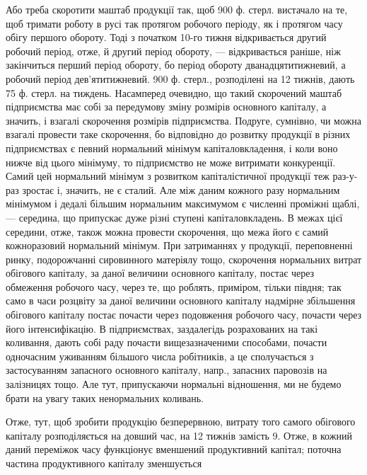 Або треба скоротити маштаб продукції так, щоб 900 ф. стерл. вистачало
на те, щоб тримати роботу в русі так протягом робочого періоду,
як і протягом часу обігу першого обороту. Тоді з початком
10-го тижня відкривається другий робочий період, отже, й другий період
обороту, — відкривається раніше, ніж закінчиться перший період обороту,
бо період обороту дванадцятитижневий, а робочий період дев’ятитижневий.
900 ф. стерл., розподілені на 12 тижнів, дають 75 ф. стерл. на тиждень.
Насамперед очевидно, що такий скорочений маштаб підприємства має
собі за передумову зміну розмірів основного капіталу, а значить, і взагалі
скорочення розмірів підприємства. Подруге, сумнівно, чи можна взагалі
провести таке скорочення, бо відповідно до розвитку продукції в різних
підприємствах є певний нормальний мінімум капіталовкладення, і коли
воно нижче від цього мінімуму, то підприємство не може витримати конкуренції.
Самий цей нормальний мінімум з розвитком капіталістичної
продукції теж раз-у-раз зростає і, значить, не є сталий. Але між даним
кожного разу нормальним мінімумом і дедалі більшим нормальним максимумом
є численні проміжні щаблі, — середина, що припускає дуже різні ступені
капіталовкладень. В межах цієї середини, отже, також можна провести
скорочення, що межа його є самий кожноразовий нормальний мінімум.
При затриманнях у продукції, переповненні ринку, подорожчанні сировинного
матеріялу тощо, скорочення нормальних витрат обігового капіталу,
за даної величини основного капіталу, постає через обмеження
робочого часу, через те, що роблять, приміром, тільки півдня; так само
в часи розцвіту за даної величини основного капіталу надмірне збільшення
обігового капіталу постає почасти через подовження робочого часу,
почасти через його інтенсифікацію. В підприємствах, заздалегідь розрахованих
на такі коливання, дають собі раду почасти вищезазначеними
способами, почасти одночасним уживанням більшого числа робітників,
а це сполучається з застосуванням запасного основного капіталу, напр.,
запасних паровозів на залізницях тощо. Але тут, припускаючи нормальні
відношення, ми не будемо брати на увагу таких ненормальних коливань.

Отже, тут, щоб зробити продукцію безперервною, витрату того самого
обігового капіталу розподіляється на довший час, на 12 тижнів замість 9.
Отже, в кожний даний переміжок часу функціонує вменшений продуктивний
капітал; поточна частина продуктивного капіталу зменшується
\parbreak{}  %
